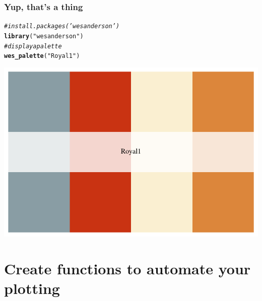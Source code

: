 \documentclass{beamer}\usepackage[]{graphicx}\usepackage[]{color}
\makeatletter
\newcommand{\hlstr}[1]{\textcolor[rgb]{0.192,0.494,0.8}{#1}}%
\newcommand{\hlcom}[1]{\textcolor[rgb]{0.678,0.584,0.686}{\textit{#1}}}%
\newcommand{\hlstd}[1]{\textcolor[rgb]{0.345,0.345,0.345}{#1}}%
\newcommand{\hlkwd}[1]{\textcolor[rgb]{0.737,0.353,0.396}{\textbf{#1}}}%
\newenvironment{kframe}{%
 \def\at@end@of@kframe{}%
 \ifinner\ifhmode%
  \def\at@end@of@kframe{\end{minipage}}%
  \begin{minipage}{\columnwidth}%
 \fi\fi%
 \def\FrameCommand##1{\hskip\@totalleftmargin \hskip-\fboxsep
 \colorbox{shadecolor}{##1}\hskip-\fboxsep
     \hskip-\linewidth \hskip-\@totalleftmargin \hskip\columnwidth}%
 \MakeFramed {\advance\hsize-\width
   \@totalleftmargin\z@ \linewidth\hsize
   \@setminipage}}%
 {\par\unskip\endMakeFramed%
 \at@end@of@kframe}
\newenvironment{knitrout}{}{} %
\makeatother
\begin{document}
\begin{frame}[fragile]
\frametitle{Yup, that's a thing}
\begin{center}
\begin{knitrout}\footnotesize
{}\color{fgcolor}\begin{kframe}
\begin{alltt}
\hlcom{# install.packages('wesanderson')}
\hlkwd{library}\hlstd{(}\hlstr{"wesanderson"}\hlstd{)}
\hlcom{# display a palette}
\hlkwd{wes_palette}\hlstd{(}\hlstr{"Royal1"}\hlstd{)}
\end{alltt}
\end{kframe}

{\centering \includegraphics[width=.75\linewidth]{figure/facet_wrap_theme_exec_royal-1} 

}



\end{knitrout}
\end{center}
\end{frame}


\section*{Create functions to automate your plotting}
\frame{\sectionpage}

\end{document}
